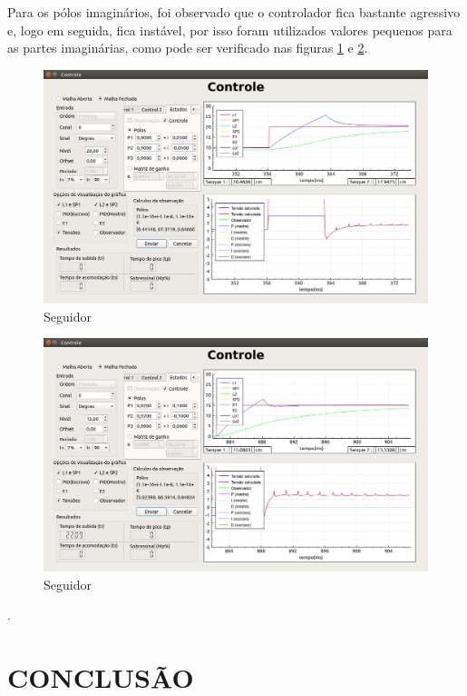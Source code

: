 \documentclass[a4paper,12pt]{article}
\begin{document}
\hspace{4ex}Para os pólos imaginários, foi observado que o controlador fica bastante agressivo e, logo em seguida, fica instável, por isso foram utilizados valores pequenos para as partes imaginárias, como pode ser verificado nas figuras \ref{img5} e \ref{img6}.
\begin{figure}[!h]
\centering
\includegraphics[width=13cm]{FotosSeguidor/PolosComplexos}
\caption{Seguidor}
\label{img5}
\end{figure}
\begin{figure}[!h]
\centering
\includegraphics[width=13cm]{FotosSeguidor/PolosComplexos2}
\caption{Seguidor}
\label{img6}
\end{figure}

\newpage
.
\newpage

\thispagestyle{main}

\section{CONCLUSÃO}
\end{document}
